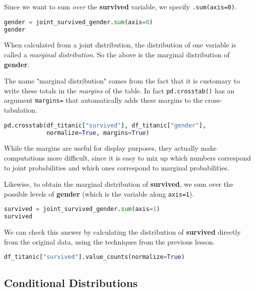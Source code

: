 Since we want to sum \textit{over} the \textbf{survived} variable, we specify \verb|.sum(axis=0)|.

\begin{lstlisting}[language=Python]
gender = joint_survived_gender.sum(axis=0)
gender
\end{lstlisting}




When calculated from a joint distribution, the distribution of one variable is called a \textit{marginal distribution}. So the above is the marginal distribution of \textbf{gender}.

The name "marginal distribution" comes from the fact that it is customary to write these totals in the \textit{margins} of the table. In fact \verb|pd.crosstab()| has an argument \verb|margins=| that automatically adds these margins to the cross-tabulation.

\begin{lstlisting}[language=Python]
pd.crosstab(df_titanic["survived"], df_titanic["gender"], 
            normalize=True, margins=True)
\end{lstlisting}




While the margins are useful for display purposes, they actually make computations more difficult, since it is easy to mix up which numbers correspond to joint probabilities and which ones correspond to marginal probabilities.

Likewise, to obtain the marginal distribution of \textbf{survived}, we sum over the possible levels of \textbf{gender} (which is the variable along \verb|axis=1|).

\begin{lstlisting}[language=Python]
survived = joint_survived_gender.sum(axis=1)
survived
\end{lstlisting}




We can check this answer by calculating the distribution of \textbf{survived} directly from the original data, using the techniques from the previous lesson.

\begin{lstlisting}[language=Python]
df_titanic["survived"].value_counts(normalize=True)
\end{lstlisting}




\subsection{Conditional Distributions}\label{2.2.2}

